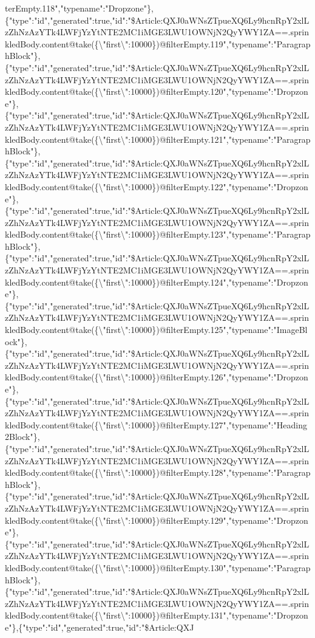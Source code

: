 terEmpty.118","typename":"Dropzone"\},\{"type":"id","generated":true,"id":"\$Article:QXJ0aWNsZTpueXQ6Ly9hcnRpY2xlLzZhNzAzYTk4LWFjYzYtNTE2MC1iMGE3LWU1OWNjN2QyYWY1ZA==.sprinkledBody.content@take(\{\textbackslash{}"first\textbackslash{}":10000\})@filterEmpty.119","typename":"ParagraphBlock"\},\{"type":"id","generated":true,"id":"\$Article:QXJ0aWNsZTpueXQ6Ly9hcnRpY2xlLzZhNzAzYTk4LWFjYzYtNTE2MC1iMGE3LWU1OWNjN2QyYWY1ZA==.sprinkledBody.content@take(\{\textbackslash{}"first\textbackslash{}":10000\})@filterEmpty.120","typename":"Dropzone"\},\{"type":"id","generated":true,"id":"\$Article:QXJ0aWNsZTpueXQ6Ly9hcnRpY2xlLzZhNzAzYTk4LWFjYzYtNTE2MC1iMGE3LWU1OWNjN2QyYWY1ZA==.sprinkledBody.content@take(\{\textbackslash{}"first\textbackslash{}":10000\})@filterEmpty.121","typename":"ParagraphBlock"\},\{"type":"id","generated":true,"id":"\$Article:QXJ0aWNsZTpueXQ6Ly9hcnRpY2xlLzZhNzAzYTk4LWFjYzYtNTE2MC1iMGE3LWU1OWNjN2QyYWY1ZA==.sprinkledBody.content@take(\{\textbackslash{}"first\textbackslash{}":10000\})@filterEmpty.122","typename":"Dropzone"\},\{"type":"id","generated":true,"id":"\$Article:QXJ0aWNsZTpueXQ6Ly9hcnRpY2xlLzZhNzAzYTk4LWFjYzYtNTE2MC1iMGE3LWU1OWNjN2QyYWY1ZA==.sprinkledBody.content@take(\{\textbackslash{}"first\textbackslash{}":10000\})@filterEmpty.123","typename":"ParagraphBlock"\},\{"type":"id","generated":true,"id":"\$Article:QXJ0aWNsZTpueXQ6Ly9hcnRpY2xlLzZhNzAzYTk4LWFjYzYtNTE2MC1iMGE3LWU1OWNjN2QyYWY1ZA==.sprinkledBody.content@take(\{\textbackslash{}"first\textbackslash{}":10000\})@filterEmpty.124","typename":"Dropzone"\},\{"type":"id","generated":true,"id":"\$Article:QXJ0aWNsZTpueXQ6Ly9hcnRpY2xlLzZhNzAzYTk4LWFjYzYtNTE2MC1iMGE3LWU1OWNjN2QyYWY1ZA==.sprinkledBody.content@take(\{\textbackslash{}"first\textbackslash{}":10000\})@filterEmpty.125","typename":"ImageBlock"\},\{"type":"id","generated":true,"id":"\$Article:QXJ0aWNsZTpueXQ6Ly9hcnRpY2xlLzZhNzAzYTk4LWFjYzYtNTE2MC1iMGE3LWU1OWNjN2QyYWY1ZA==.sprinkledBody.content@take(\{\textbackslash{}"first\textbackslash{}":10000\})@filterEmpty.126","typename":"Dropzone"\},\{"type":"id","generated":true,"id":"\$Article:QXJ0aWNsZTpueXQ6Ly9hcnRpY2xlLzZhNzAzYTk4LWFjYzYtNTE2MC1iMGE3LWU1OWNjN2QyYWY1ZA==.sprinkledBody.content@take(\{\textbackslash{}"first\textbackslash{}":10000\})@filterEmpty.127","typename":"Heading2Block"\},\{"type":"id","generated":true,"id":"\$Article:QXJ0aWNsZTpueXQ6Ly9hcnRpY2xlLzZhNzAzYTk4LWFjYzYtNTE2MC1iMGE3LWU1OWNjN2QyYWY1ZA==.sprinkledBody.content@take(\{\textbackslash{}"first\textbackslash{}":10000\})@filterEmpty.128","typename":"ParagraphBlock"\},\{"type":"id","generated":true,"id":"\$Article:QXJ0aWNsZTpueXQ6Ly9hcnRpY2xlLzZhNzAzYTk4LWFjYzYtNTE2MC1iMGE3LWU1OWNjN2QyYWY1ZA==.sprinkledBody.content@take(\{\textbackslash{}"first\textbackslash{}":10000\})@filterEmpty.129","typename":"Dropzone"\},\{"type":"id","generated":true,"id":"\$Article:QXJ0aWNsZTpueXQ6Ly9hcnRpY2xlLzZhNzAzYTk4LWFjYzYtNTE2MC1iMGE3LWU1OWNjN2QyYWY1ZA==.sprinkledBody.content@take(\{\textbackslash{}"first\textbackslash{}":10000\})@filterEmpty.130","typename":"ParagraphBlock"\},\{"type":"id","generated":true,"id":"\$Article:QXJ0aWNsZTpueXQ6Ly9hcnRpY2xlLzZhNzAzYTk4LWFjYzYtNTE2MC1iMGE3LWU1OWNjN2QyYWY1ZA==.sprinkledBody.content@take(\{\textbackslash{}"first\textbackslash{}":10000\})@filterEmpty.131","typename":"Dropzone"\},\{"type":"id","generated":true,"id":"\$Article:QXJ
